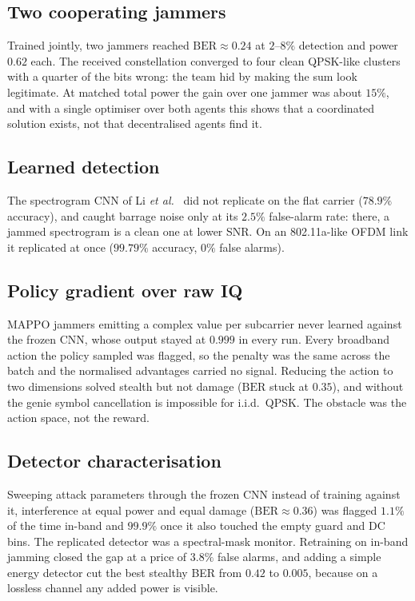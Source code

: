 \subsection{Two cooperating jammers}
Trained jointly, two jammers reached $\mathrm{BER} \approx 0.24$ at $2$--$8\%$ detection and power
$0.62$ each.
The received constellation converged to four clean QPSK-like clusters with a quarter of the bits
wrong: the team hid by making the sum look legitimate.
At matched total power the gain over one jammer was about $15\%$, and with a single optimiser over
both agents this shows that a coordinated solution exists, not that decentralised agents find it.

\subsection{Learned detection}
The spectrogram CNN of Li \emph{et al.}~\cite{li2022jamming_ofdm} did not replicate on the flat carrier
($78.9\%$ accuracy), and caught barrage noise only at its $2.5\%$ false-alarm rate: there, a jammed
spectrogram is a clean one at lower SNR.
On an 802.11a-like OFDM link it replicated at once ($99.79\%$ accuracy, $0\%$ false alarms).

\subsection{Policy gradient over raw IQ}
MAPPO jammers emitting a complex value per subcarrier never learned against the frozen CNN, whose
output stayed at $0.999$ in every run.
Every broadband action the policy sampled was flagged, so the penalty was the same across the batch
and the normalised advantages carried no signal.
Reducing the action to two dimensions solved stealth but not damage ($\mathrm{BER}$ stuck at $0.35$),
and without the genie symbol cancellation is impossible for i.i.d.\ QPSK.
The obstacle was the action space, not the reward.

\subsection{Detector characterisation}
Sweeping attack parameters through the frozen CNN instead of training against it, interference at
equal power and equal damage ($\mathrm{BER} \approx 0.36$) was flagged $1.1\%$ of the time in-band and
$99.9\%$ once it also touched the empty guard and DC bins.
The replicated detector was a spectral-mask monitor.
Retraining on in-band jamming closed the gap at a price of $3.8\%$ false alarms, and adding a simple
energy detector cut the best stealthy BER from $0.42$ to $0.005$, because on a lossless channel any
added power is visible.

